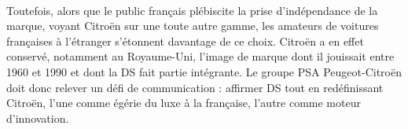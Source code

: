 \documentclass[12pt]{article}\usepackage[]{graphicx}\usepackage[]{color}
\begin{document}
\paragraph{} Toutefois, alors que le public français plébiscite la prise d'indépendance de la marque, voyant Citroën sur une toute autre gamme, les amateurs de voitures françaises à l'étranger s'étonnent davantage de ce choix. Citroën a en effet conservé, notamment au Royaume-Uni, l'image de marque dont il jouissait entre 1960 et 1990 et dont la DS fait partie intégrante. Le groupe PSA Peugeot-Citroën doit donc relever un défi de communication : affirmer DS tout en redéfinissant Citroën, l'une comme égérie du luxe à la française, l'autre comme moteur d'innovation.

\printbibliography%
\end{document}
